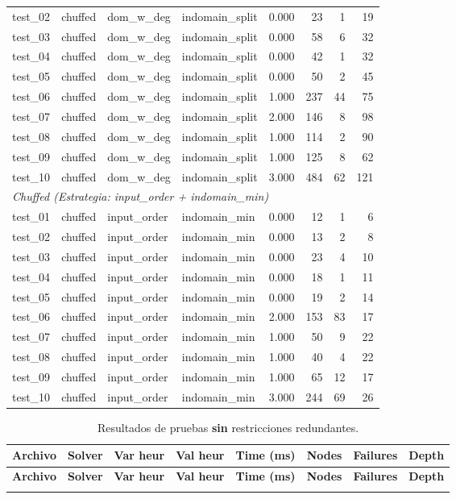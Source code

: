\begin{longtable}{l l l l r r r r}
test\_02 & chuffed & dom\_w\_deg & indomain\_split & 0.000 & 23 & 1 & 19 \\
test\_03 & chuffed & dom\_w\_deg & indomain\_split & 0.000 & 58 & 6 & 32 \\
test\_04 & chuffed & dom\_w\_deg & indomain\_split & 0.000 & 42 & 1 & 32 \\
test\_05 & chuffed & dom\_w\_deg & indomain\_split & 0.000 & 50 & 2 & 45 \\
test\_06 & chuffed & dom\_w\_deg & indomain\_split & 1.000 & 237 & 44 & 75 \\
test\_07 & chuffed & dom\_w\_deg & indomain\_split & 2.000 & 146 & 8 & 98 \\
test\_08 & chuffed & dom\_w\_deg & indomain\_split & 1.000 & 114 & 2 & 90 \\
test\_09 & chuffed & dom\_w\_deg & indomain\_split & 1.000 & 125 & 8 & 62 \\
test\_10 & chuffed & dom\_w\_deg & indomain\_split & 3.000 & 484 & 62 & 121 \\
\midrule
\multicolumn{8}{l}{\textit{Chuffed (Estrategia: input\_order + indomain\_min)}} \\
\midrule
test\_01 & chuffed & input\_order & indomain\_min & 0.000 & 12 & 1 & 6 \\
test\_02 & chuffed & input\_order & indomain\_min & 0.000 & 13 & 2 & 8 \\
test\_03 & chuffed & input\_order & indomain\_min & 0.000 & 23 & 4 & 10 \\
test\_04 & chuffed & input\_order & indomain\_min & 0.000 & 18 & 1 & 11 \\
test\_05 & chuffed & input\_order & indomain\_min & 0.000 & 19 & 2 & 14 \\
test\_06 & chuffed & input\_order & indomain\_min & 2.000 & 153 & 83 & 17 \\
test\_07 & chuffed & input\_order & indomain\_min & 1.000 & 50 & 9 & 22 \\
test\_08 & chuffed & input\_order & indomain\_min & 1.000 & 40 & 4 & 22 \\
test\_09 & chuffed & input\_order & indomain\_min & 1.000 & 65 & 12 & 17 \\
test\_10 & chuffed & input\_order & indomain\_min & 3.000 & 244 & 69 & 26 \\

\end{longtable}

\begin{longtable}{l l l l r r r r}
\caption{Resultados de pruebas \textbf{sin} restricciones redundantes.}\label{tab:pruebas-jobshop_mantenimiento-off}\\
\toprule
\textbf{Archivo} & \textbf{Solver} & \textbf{Var heur} & \textbf{Val heur} & \textbf{Time (ms)} & \textbf{Nodes} & \textbf{Failures} & \textbf{Depth} \\
\midrule
\endfirsthead
\toprule
\textbf{Archivo} & \textbf{Solver} & \textbf{Var heur} & \textbf{Val heur} & \textbf{Time (ms)} & \textbf{Nodes} & \textbf{Failures} & \textbf{Depth} \\
\midrule
\endhead
\bottomrule
\endlastfoot
\end{longtable}
